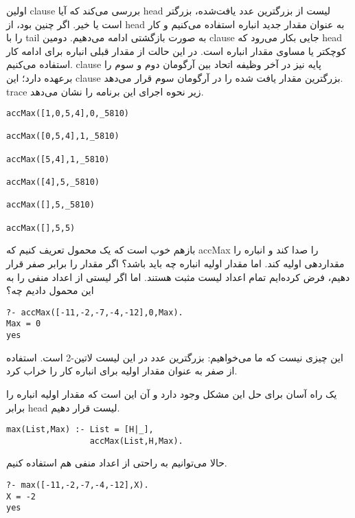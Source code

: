 اولین clause بررسی می‌کند که آیا head‌ لیست از بزرگترین عدد یافت‌شده، بزرگتر است یا خیر. اگر چنین بود، از head به عنوان مقدار جدید انباره استفاده می‌کنیم و کار را با tail‌ به صورت بازگشتی ادامه می‌دهیم. دومین clause جایی بکار می‌رود که head کوچکتر یا مساوی مقدار انباره است. در این حالت از مقدار قبلی انباره برای ادامه کار استفاده می‌کنیم. clause پایه نیز در آخر وظیفه اتحاد بین آرگومان دوم و سوم را برعهده دارد؛ این clause بزرگترین مقدار یافت شده را در آرگومان سوم قرار می‌دهد. trace‌ زیر نحوه اجرای این برنامه را نشان می‌دهد.

\begin{latin}
\begin{lstlisting}
accMax([1,0,5,4],0,_5810)

accMax([0,5,4],1,_5810)

accMax([5,4],1,_5810)

accMax([4],5,_5810)

accMax([],5,_5810)

accMax([],5,5)
\end{lstlisting}
\end{latin}

بازهم خوب است که یک محمول تعریف کنیم که accMax را صدا کند و انباره را مقداردهی اولیه کند. اما مقدار اولیه انباره چه باید باشد؟ اگر مقدار را برابر صفر قرار دهیم، فرض کرده‌ایم تمام اعداد لیست مثبت هستند. اما اگر لیستی از اعداد منفی را به این محمول دادیم چه؟

\begin{latin}
\begin{lstlisting}
?- accMax([-11,-2,-7,-4,-12],0,Max).
Max = 0
yes
\end{lstlisting}
\end{latin}

این چیزی نیست که ما می‌خواهیم: بزرگترین عدد در این لیست ‌لاتین{-2} است. استفاده از صفر به عنوان مقدار اولیه برای انباره کار را خراب کرد.

یک راه آسان برای حل این مشکل وجود دارد و آن این است که مقدار اولیه انباره را برابر head لیست قرار دهیم.

\begin{latin}
\begin{lstlisting}
max(List,Max) :- List = [H|_],
                 accMax(List,H,Max).
\end{lstlisting}
\end{latin}

حالا می‌توانیم به راحتی از اعداد منفی هم استفاده کنیم.

\begin{latin}
\begin{lstlisting}
?- max([-11,-2,-7,-4,-12],X).
X = -2
yes
\end{lstlisting}
\end{latin}

